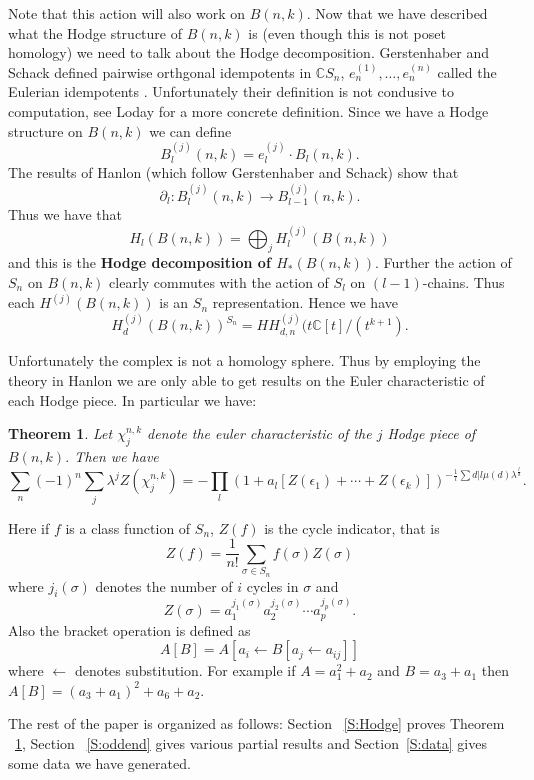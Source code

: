 \documentclass{amsart}
\newtheorem{theorem}{Theorem}[section]
\newcommand{\C}{\mathbb{C}}
\begin{document}
Note that this action will also work on $B(n, k)$. Now that we have described what the Hodge structure of $B(n, k)$ is (even though this is not poset
homology) we need to talk about the Hodge decomposition. Gerstenhaber and Schack defined pairwise orthgonal idempotents in
$\C S_n$, $e_n^{(1)}, \ldots, e_n^{(n)}$ called the Eulerian idempotents \cite{GS}. Unfortunately their definition is not
condusive to computation, see Loday \cite{Loday} for a more concrete definition. Since we have a Hodge structure on 
$B(n, k)$ we can define $$B_l^{(j)}(n, k) = e_l^{(j)} \cdot B_l(n, k).$$ The results of Hanlon (which follow Gerstenhaber
and Schack) show that $$\partial_l \colon B_l^{(j)}(n, k) \rightarrow B_{l-1}^{(j)}(n, k).$$ Thus we have that 
$$H_l(B(n, k)) = \bigoplus_j H_l^{(j)}(B(n, k))$$ and this is the {\bf Hodge decomposition of $H_*(B(n, k))$}. Further the
action of $S_n$ on $B(n, k)$ clearly commutes with the action of $S_l$ on $(l-1)$-chains. Thus each $H^{(j)}(B(n, k))$ is
an $S_n$ representation. Hence we have
\begin{equation}
  H_d^{(j)}(B(n, k))^{S_n} = HH_{d, n}^{(j)}(t\C[t]/(t^{k+1}).
\end{equation}

Unfortunately the complex is not a homology sphere. Thus by employing the theory in Hanlon 
\cite{Hanlon} we are only able to get results on the Euler characteristic of each Hodge piece. In particular we have:

\begin{theorem} \label{T:Hodgeintro} Let $\chi_j^{n, k}$ denote the euler characteristic of the $j$ Hodge piece of $B(n, k)$. 
Then we have $$\sum_n (-1)^n \sum_j \lambda^j Z(\chi_j^{n, k}) = - \prod_l (1 + a_l[Z(\epsilon_1) + \cdots + 
Z(\epsilon_k)])^{-\frac{1}{l}\sum{d|l} \mu(d) \lambda^{\frac{l}{d}}}.$$
\end{theorem} 

Here if $f$ is a class function of $S_n$, $Z(f)$ is the cycle indicator, that is $$Z(f) = \frac{1}{n!} \sum_{\sigma \in S_n}
 f(\sigma) Z(\sigma)$$ where $j_i(\sigma)$ denotes the number of $i$ cycles in $\sigma$ and $$Z(\sigma) = 
a_1^{j_1(\sigma)} a_2^{j_2(\sigma)} \cdots a_p^{j_p(\sigma)}.$$ Also the bracket operation is defined as $$A[B] = A[ a_i
\leftarrow B[a_j \leftarrow a_{ij}]]$$ where $\leftarrow$ denotes substitution. For example if $A = a_1^2 + a_2$ and 
$B= a_3+a_1$ then $A[B] = (a_3+a_1)^2 + a_6+a_2$. 




The rest of the paper is organized as follows: Section ~\ref{S:Hodge} proves Theorem ~\ref{T:Hodgeintro}, Section 
~\ref{S:oddend} gives various partial results 
and Section~\ref{S:data} gives some data we have generated.
\end{document}
